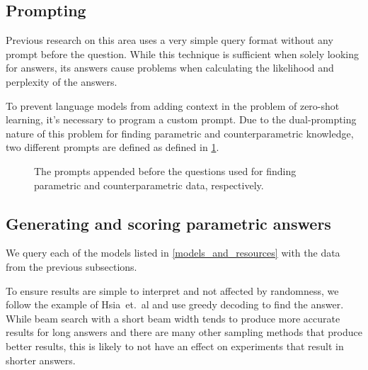 \subsection{Prompting}

Previous research on this area uses a very simple query format without any prompt before the question\cite{how_can_we_know}\cite{factual_recall}.
While this technique is sufficient when solely looking for answers, its answers cause problems when calculating the likelihood and perplexity of the answers.

To prevent language models from adding context in the problem of zero-shot learning, it's necessary to program a custom prompt\cite{beyondfewshot}.
Due to the dual-prompting nature of this problem for finding parametric and counterparametric knowledge, two different prompts are defined as defined in \cref{prompts}.

\begin{figure}[h]
	 \hfill{}
	\caption{The prompts appended before the questions used for finding parametric and counterparametric data, respectively.}
	\label{prompts}
\end{figure}

\subsection{Generating and scoring parametric answers}

We query each of the models listed in \cref{models_and_resources} with the data from the previous subsections.

To ensure results are simple to interpret and not affected by randomness, we follow the example of Hsia~et.~al\cite{ragged} and use greedy decoding to find the answer.
While beam search with a short beam width tends to produce more accurate results for long answers\cite{sutskever_seq2seqlearning,wu_mltranslation} and there are many other sampling methods that produce better results\cite{text_degeneration}, this is likely to not have an effect on experiments that result in shorter answers\cite{t5}.

